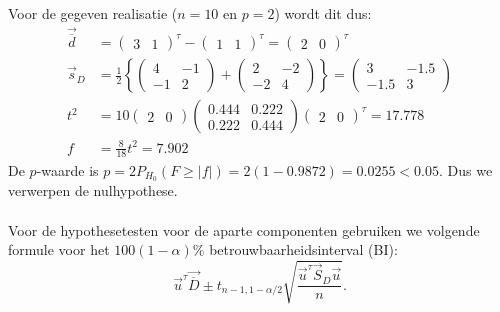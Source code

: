 \documentclass[a4paper,dutch,11pt,]{scrartcl}
\begin{document}
Voor de gegeven realisatie ($n = 10$ en $p=2$) wordt dit dus:
\begin{align*}
 \vec{\overline{d}} &= \begin{pmatrix}
                             3 & 1
                             \end{pmatrix}^\tau - \begin{pmatrix}
                             1 & 1
                             \end{pmatrix}^\tau =  \begin{pmatrix}
                             2 & 0
                             \end{pmatrix}^\tau \\
 \vec{s}_D &= \frac{1}{2} \left\{ \begin{pmatrix}
                 4 & -1\\
		  -1 & 2
                \end{pmatrix}+\begin{pmatrix}
                 2 & -2\\
		  -2 & 4
                \end{pmatrix}\right\} = \begin{pmatrix}
                 3 & -1.5\\
		  -1.5 & 3
                \end{pmatrix} \\
 t^2 &= 10\begin{pmatrix}
           2 & 0
          \end{pmatrix}
	  \begin{pmatrix} 
           0.444 & 0.222\\
	    0.222  & 0.444
           \end{pmatrix}
\begin{pmatrix} 2 & 0 \end{pmatrix}^\tau = 17.778 \\
f&= \frac{8}{18}t^2=     7.902
\end{align*}
De $p$-waarde is $p=2P_{H_0}(F \geq |f|)= 2( 1-0.9872)= 0.0255 <  0.05$. Dus we verwerpen de nulhypothese.


\paragraph{}
Voor de hypothesetesten voor de aparte componenten gebruiken we volgende formule voor het $100(1-\alpha )\%$ betrouwbaarheidsinterval (BI):
\[\vec{u}^\tau \vec{\overline{D}} \pm t_{n-1,1-\alpha /2}\sqrt{\frac{\vec{u}^\tau \vec{S}_D\vec{u}}{n}}.\]
\end{document}
